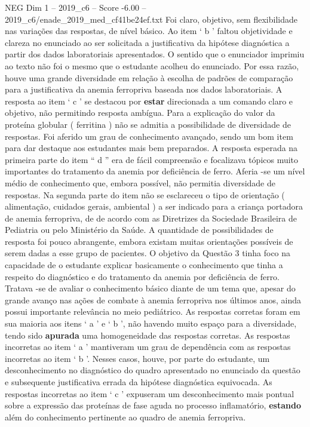 \begin{textsample}{NEG Dim 1 – 2019\_c6 – Score -6.00 – 2019\_c6/enade\_2019\_med\_cf41be24ef.txt}
Foi claro, objetivo, sem flexibilidade nas variações das respostas, de nível básico.
Ao item ‘ b ’ faltou objetividade e clareza no enunciado ao ser solicitada a justificativa da hipótese diagnóstica a partir dos dados laboratoriais apresentados.
O sentido que o enunciador imprimiu ao texto não foi o mesmo que o estudante acolheu do enunciado.
Por essa razão, houve uma grande diversidade em relação à escolha de padrões de comparação para a justificativa da anemia ferropriva baseada nos dados laboratoriais.
A resposta ao item ‘ c ’ se destacou por \textbf{estar} direcionada a um comando claro e objetivo, não permitindo resposta ambígua.
Para a explicação do valor da proteína globular ( ferritina ) não se admitia a possibilidade de diversidade de respostas.
Foi aferido um grau de conhecimento avançado, sendo um bom item para dar destaque aos estudantes mais bem preparados.
A resposta esperada na primeira parte do item “ d ” era de fácil compreensão e focalizava tópicos muito importantes do tratamento da anemia por deficiência de ferro.
Aferia -se um nível médio de conhecimento que, embora possível, não permitia diversidade de respostas.
Na segunda parte do item não se esclareceu o tipo de orientação ( alimentação, cuidados gerais, ambiental ) a ser indicado para a criança portadora de anemia ferropriva, de de acordo com as Diretrizes da Sociedade Brasileira de Pediatria ou pelo Ministério da Saúde.
A quantidade de possibilidades de resposta foi pouco abrangente, embora existam muitas orientações possíveis de serem dadas a esse grupo de pacientes.
O objetivo da Questão 3 tinha foco na capacidade de o estudante explicar basicamente o conhecimento que tinha a respeito do diagnóstico e do tratamento da anemia por deficiência de ferro.
Tratava -se de avaliar o conhecimento básico diante de um tema que, apesar do grande avanço nas ações de combate à anemia ferropriva nos últimos anos, ainda possui importante relevância no meio pediátrico.
As respostas corretas foram em sua maioria aos itens ‘ a ’ e ‘ b ’, não havendo muito espaço para a diversidade, tendo sido \textbf{apurada} uma homogeneidade das respostas corretas.
As respostas incorretas ao item ‘ a ’ mantiveram um grau de dependência com as respostas incorretas ao item ‘ b ’.
Nesses casos, houve, por parte do estudante, um desconhecimento no diagnóstico do quadro apresentado no enunciado da questão e subsequente justificativa errada da hipótese diagnóstica equivocada.
As respostas incorretas ao item ‘ c ’ expuseram um desconhecimento mais pontual sobre a expressão das proteínas de fase aguda no processo inflamatório, \textbf{estando} além do conhecimento pertinente ao quadro de anemia ferropriva.

\end{textsample}
